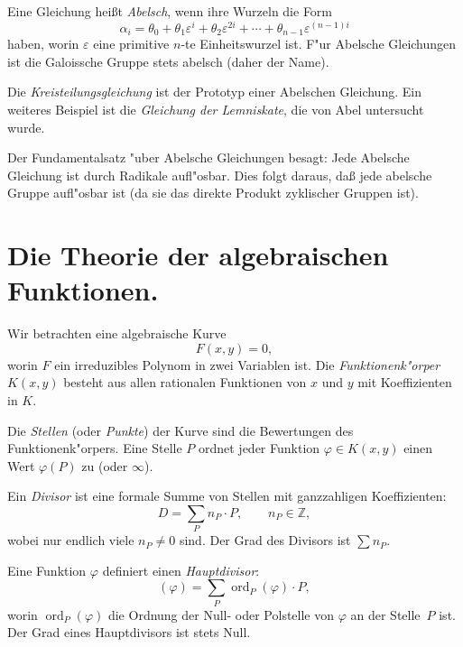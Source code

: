 \documentclass[12pt,a4paper]{article}
\theoremstyle{definition}
\begin{document}
Eine Gleichung hei\ss{}t \emph{Abelsch}, wenn ihre Wurzeln die Form
\begin{equation}\tag{1}
\alpha_i = \theta_0 + \theta_1\varepsilon^i + \theta_2\varepsilon^{2i} + \cdots + \theta_{n-1}\varepsilon^{(n-1)i}
\end{equation}
haben, worin $\varepsilon$ eine primitive $n$-te Einheitswurzel ist. F"ur Abelsche Gleichungen ist die Galoissche Gruppe stets abelsch (daher der Name).

\newpage

Die \emph{Kreisteilungsgleichung} ist der Prototyp einer Abelschen Gleichung. Ein weiteres Beispiel ist die \emph{Gleichung der Lemniskate}, die von Abel untersucht wurde.

Der Fundamentalsatz "uber Abelsche Gleichungen besagt: Jede Abelsche Gleichung ist durch Radikale aufl"osbar. Dies folgt daraus, da\ss{}{} jede abelsche Gruppe aufl"osbar ist (da sie das direkte Produkt zyklischer Gruppen ist).

\section{Die Theorie der algebraischen Funktionen.}

Wir betrachten eine algebraische Kurve
\begin{equation}\tag{1}
F(x,y) = 0,
\end{equation}
worin $F$ ein irreduzibles Polynom in zwei Variablen ist. Die \emph{Funktionenk"orper} $K(x,y)$ besteht aus allen rationalen Funktionen von $x$ und $y$ mit Koeffizienten in $K$.

Die \emph{Stellen} (oder \emph{Punkte}) der Kurve sind die Bewertungen des Funktionenk"orpers. Eine Stelle $P$ ordnet jeder Funktion $\varphi \in K(x,y)$ einen Wert $\varphi(P)$ zu (oder $\infty$).

\newpage

Ein \emph{Divisor} ist eine formale Summe von Stellen mit ganzzahligen Koeffizienten:
\begin{equation}\tag{2}
D = \sum_P n_P \cdot P,\qquad n_P \in \mathbb{Z},
\end{equation}
wobei nur endlich viele $n_P \neq 0$ sind. Der Grad des Divisors ist $\sum n_P$.

Eine Funktion $\varphi$ definiert einen \emph{Hauptdivisor}:
\begin{equation}\tag{3}
(\varphi) = \sum_P \operatorname{ord}_P(\varphi) \cdot P,
\end{equation}
worin $\operatorname{ord}_P(\varphi)$ die Ordnung der Null- oder Polstelle von $\varphi$ an der Stelle~$P$ ist. Der Grad eines Hauptdivisors ist stets Null.
\end{document}
